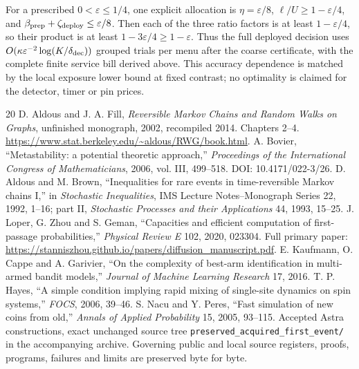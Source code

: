 \documentclass[11pt,a4paper]{article}
\newcommand{\eps}{\varepsilon}
\begin{document}
For a prescribed $0<\eps\le1/4$, one explicit allocation is
$\eta=\eps/8$, $\ell/U\ge1-\eps/4$, and
$\beta_{\rm prep}+\zeta_{\rm deploy}\le\eps/8$.
Then each of the three ratio factors is at least $1-\eps/4$,
so their product is at least $1-3\eps/4\ge1-\eps$.
Thus the full deployed decision uses
$O(\kappa\eps^{-2}\log(K/\delta_{\rm dec}))$ grouped trials per
menu after the coarse certificate, with the complete finite service
bill derived above. This accuracy dependence is matched by the local
exposure lower bound at fixed contrast; no optimality is claimed for
the detector, timer or pin prices.



\begin{thebibliography}{20}
 D. Aldous and J. A. Fill, \emph{Reversible Markov Chains and Random Walks on Graphs}, unfinished monograph, 2002, recompiled 2014. Chapters 2--4. \url{https://www.stat.berkeley.edu/~aldous/RWG/book.html}.
 A. Bovier, ``Metastability: a potential theoretic approach,'' \emph{Proceedings of the International Congress of Mathematicians}, 2006, vol. III, 499--518. DOI: 10.4171/022-3/26.
 D. Aldous and M. Brown, ``Inequalities for rare events in time-reversible Markov chains I,'' in \emph{Stochastic Inequalities}, IMS Lecture Notes--Monograph Series 22, 1992, 1--16; part II, \emph{Stochastic Processes and their Applications} 44, 1993, 15--25.
 J. Loper, G. Zhou and S. Geman, ``Capacities and efficient computation of first-passage probabilities,'' \emph{Physical Review E} 102, 2020, 023304. Full primary paper: \url{https://stanniszhou.github.io/papers/diffusion_manuscript.pdf}.
 E. Kaufmann, O. Cappe and A. Garivier, ``On the complexity of best-arm identification in multi-armed bandit models,'' \emph{Journal of Machine Learning Research} 17, 2016.
 T. P. Hayes, ``A simple condition implying rapid mixing of single-site dynamics on spin systems,'' \emph{FOCS}, 2006, 39--46.
 S. Nacu and Y. Peres, ``Fast simulation of new coins from old,'' \emph{Annals of Applied Probability} 15, 2005, 93--115.
 Accepted Astra constructions, exact unchanged source tree \texttt{preserved\_acquired\_first\_event/} in the accompanying archive. Governing public and local source registers, proofs, programs, failures and limits are preserved byte for byte.
\end{thebibliography}
\end{document}

